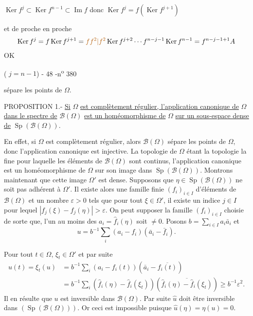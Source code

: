 
$\operatorname{Ker}f^j\subset\operatorname{Ker}f^{n-1}\subset\operatorname{Im}f$ donc $\operatorname{Ker}f^j=f(\operatorname{Ker}f^{j+1})$

et de proche en proche 
\[
\operatorname{Ker}f^j=f\operatorname{Ker}f^{j+1}=\unsure{ff^2|f^2}\operatorname{Ker}f^{j+2}\cdots f^{n-j-1}\operatorname{Ker}f^{n-1}=f^{n-j-1+1}A
\]
OK

( $j=n-1$)
- 48 -\hfill n\textsuperscript{o} 380

sépare les points de $\Omega$.

PROPOSITION 1.- \uline{Si} $\Omega$ \uline{est complètement régulier, l'application canonique de} $\Omega$ \uline{dans le spectre de} $\mathcal B(\Omega)$ \uline{est un homéomorphisme de} $\Omega$ \uline{sur un sous-espace dense de} $\operatorname{Sp}(\mathcal B(\Omega))$.

En effet, si $\Omega$ est complètement régulier, alors $\mathcal B(\Omega)$ sépare les points de $\Omega$, donc l'application canonique est injective. La topologie de $\Omega$ étant la topologie la \quad fine pour laquelle les éléments de $\mathcal B(\Omega)$ sont continus, l'application canonique est un homéomorphisme de $\Omega$ sur son image dans $\operatorname{Sp}(\mathcal B(\Omega))$. Montrons maintenant que cette image $\Omega'$ est dense. Supposons que $\eta\in\operatorname{Sp}(\mathcal B(\Omega))$ ne soit pas adhérent à $\Omega'$. Il existe alors une famille finie $(f_i)_{i\in I}$ d'éléments de $\mathcal B(\Omega)$ et un nombre $\varepsilon>0$ tels que pour tout $\xi\in\Omega'$, il existe un indice $j\in I$ pour lequel $|f_j(\xi)-f_j(\eta)|>\varepsilon$. On peut supposer la famille $(f_i)_{i\in I}$ choisie de sorte que, l'un au moins des $a_i=\widehat f_i(\eta)$ soit $\ne0$. Posons $b=\sum_{i\in I}a_i\bar a_i$ et
\[
u=b^{-1}\sum_i(a_i-f_i)(\bar a_i-\bar f_i).
\]

Pour tout $t\in\Omega$, $\xi_t\in\Omega'$ et par suite
\[
\begin{aligned}
u(t)=\xi_t(u)&=b^{-1}\sum_i(a_i-f_i(t))(\bar a_i-\overline{f_i(t)})\\
&=b^{-1}\sum_i(\widehat f_i(\eta)-\widehat f_i(\xi_t))(\overline{\widehat f_i(\eta)-\widehat f_i(\xi_t)})\geq b^{-1}\varepsilon^2.
\end{aligned}
\]
Il en résulte que $u$ est inversible dans $\mathcal B(\Omega)$. Par suite $\widehat u$ doit être inversible dans $(\operatorname{Sp}(\mathcal B(\Omega)))$. Or ceci est impossible puisque $\widehat u(\eta)=\eta(u)=0$.

